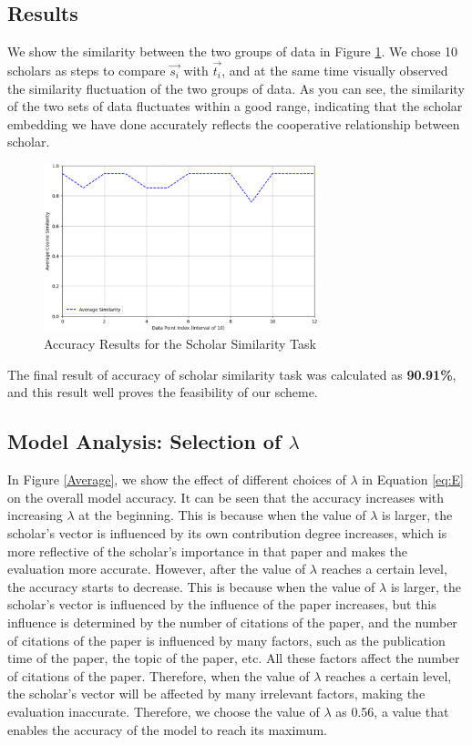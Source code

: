 \documentclass[a4paper]{jpconf}
\begin{document}
\subsection{Results}
We show the similarity between the two groups of data in Figure \ref{Accuracy}. We chose 10 scholars as steps to compare \(\vec{s_i}\) with \(\vec{t_i}\), and at the same time visually observed the similarity fluctuation of the two groups of data. As you can see, the similarity of the two sets of data fluctuates within a good range, indicating that the scholar embedding we have done accurately reflects the cooperative relationship between scholar.

\begin{figure}[htbp] %
\centering %
\includegraphics[width=8cm]{img/image.png}
\caption{Accuracy Results for the Scholar Similarity Task} %
\label{Accuracy} %
\end{figure}

The final result of accuracy of scholar similarity task was calculated as
\textbf{90.91\%}, and this result well proves the feasibility of our
scheme.

\subsection{Model Analysis: Selection of $\lambda$}
In Figure \ref{Average}, we show the effect of different choices of $\lambda$ in Equation \ref{eq:E} on the overall model accuracy. 
It can be seen that the accuracy increases with increasing
\(\lambda\) at the beginning. This is because when the value of
\(\lambda\) is larger, the scholar's vector is influenced by its own
contribution degree increases, which is more reflective of the scholar's
importance in that paper and makes the evaluation more accurate.
However, after the value of \(\lambda\) reaches a certain level, the
accuracy starts to decrease. This is because when the value of
\(\lambda\) is larger, the scholar's vector is influenced by the
influence of the paper increases, but this influence is determined
by the number of citations of the paper, and the number of citations of
the paper is influenced by many factors, such as the publication time of
the paper, the topic of the paper, etc. All these factors affect the
number of citations of the paper. Therefore, when the value of
\(\lambda\) reaches a certain level, the scholar's vector will be
affected by many irrelevant factors, making the evaluation inaccurate.
Therefore, we choose the value of \(\lambda\) as 0.56, a value that
enables the accuracy of the model to reach its maximum.
\end{document}
